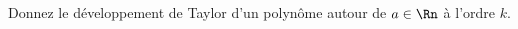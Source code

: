 
\begin{exercice}\label{exoDevel0004}

Donnez le développement de Taylor d'un polynôme autour de $a\in \Rn$ à l'ordre $k$.

\end{exercice}
